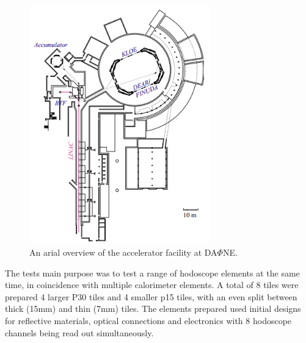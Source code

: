 \begin{figure}
	\centering
	\includegraphics[width=0.7\textwidth]{ImgChap1/BTF}
	\caption{An arial overview of the accelerator facility at DA$\Phi$NE. \cite{mazzitelli2003commissioning}}
	\label{BTF}
\end{figure}

The tests main purpose was to test a range of hodoscope elements at the same time, in coincidence with multiple calorimeter elements. A total of 8 tiles were prepared 4 larger P30 tiles and 4 smaller p15 tiles, with an even split between thick (15mm) and thin (7mm) tiles. The elements prepared used initial designs for reflective materials, optical connections and electronics with 8 hodoscope channels being read out simultaneously.

